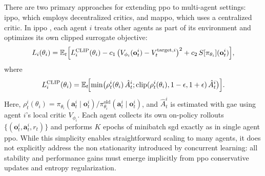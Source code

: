 \subsection{}
There are two primary approaches for extending \gls{ppo} to multi-agent settings: \gls{ippo}, which employs decentralized critics, and \gls{mappo}, which uses a centralized critic.
In \gls{ippo} \cite{witt_is_2020}, each agent \(i\) treats other agents as part of its environment and optimizes its own clipped surrogate objective:
\begin{equation}
L_i(\theta_i) = \mathbb{E}_t\Bigl[L^{\mathrm{CLIP}}_i(\theta_i) 
  - c_1\,\bigl(V_{\phi_i}(\mathbf{o}^i_t)-V^{\text{target},i}_t\bigr)^2 
  + c_2\,S[\pi_{\theta_i}](\mathbf{o}^i_t)\Bigr],
\end{equation}
where
\begin{equation}
L^{\mathrm{CLIP}}_i(\theta_i) = \mathbb{E}_t\!\Bigl[\min\bigl(\rho^i_t(\theta_i)\,\hat{A}^i_t;\text{clip}(\rho^i_t(\theta_i),1-\epsilon,1+\epsilon)\,\hat{A}^i_t\bigr)\Bigr].
\end{equation}
Here, \(\rho^i_t(\theta_i)=\pi_{\theta_i}(\mathbf{a}^i_t\mid \mathbf{o}^i_t)/\pi_{\theta_i}^{\mathrm{old}}(\mathbf{a}^i_t\mid \mathbf{o}^i_t)\), and \(\hat{A}^i_t\) is estimated with \gls{gae} using agent \(i\)'s local critic \(V_{\phi_i}\). Each agent collects its own on-policy rollouts \(\{(\mathbf{o}^i_t,\mathbf{a}^i_t,r_t)\}\) and performs \(K\) epochs of minibatch \gls{sgd} exactly as in single agent \gls{ppo}.  While this simplicity enables straightforward scaling to many agents, it does not explicitly address the non stationarity introduced by concurrent learning: all stability and performance gains must emerge implicitly from \gls{ppo} conservative updates and entropy regularization.

